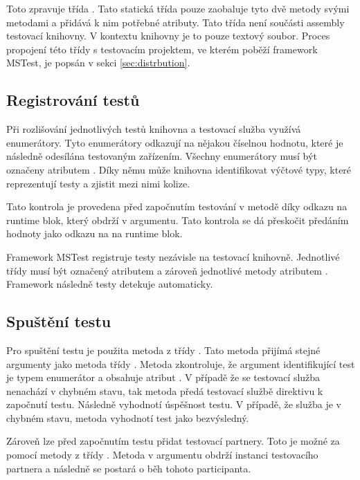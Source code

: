 Toto zpravuje třída . Tato statická třída pouze zaobaluje tyto dvě metody svými metodami a přidává k nim potřebné atributy. Tato třída není součásti assembly testovací knihovny. V kontextu knihovny je to pouze textový soubor. Proces propojení této třídy s testovacím projektem, ve kterém poběží framework MSTest, je popsán v sekci \ref{sec:distrbution}.

\subsection{Registrování testů}

Při rozlišování jednotlivých testů knihovna a testovací služba využívá enumerátory. Tyto enumerátory odkazují na nějakou číselnou hodnotu, které je následně odesílána testovaným zařízením. Všechny enumerátory musí být označeny atributem . Díky němu může knihovna identifikovat výčtové typy, které reprezentují testy a zjistit mezi nimi kolize. 

Tato kontrola je provedena před započnutím testování v metodě  díky odkazu na runtime blok, který obdrží v argumentu. Tato kontrola se dá přeskočit předáním hodnoty  jako odkazu na na runtime blok.

Framework MSTest registruje testy nezávisle na testovací knihovně. Jednotlivé třídy musí být označený atributem  a zároveň jednotlivé metody atributem . Framework následně testy detekuje automaticky.

\subsection{Spuštění testu}
Pro spuštění testu je použita metoda  z třídy . Tato metoda přijímá stejné argumenty jako metoda  třídy . Metoda zkontroluje, že argument identifikující test je typem enumerátor a obsahuje atribut . V případě že se testovací služba nenachází v chybném stavu, tak metoda předá testovací službě direktivu k započnutí testu. Následně vyhodnotí úspěšnost testu. V případě, že služba je v chybném stavu, metoda vyhodnotí test jako bezvýsledný.

Zároveň lze před započnutím testu přidat testovací partnery. Toto je možné za pomocí metody  z třídy . Metoda v argumentu obdrží instanci testovacího partnera a následně se postará o běh tohoto participanta.


